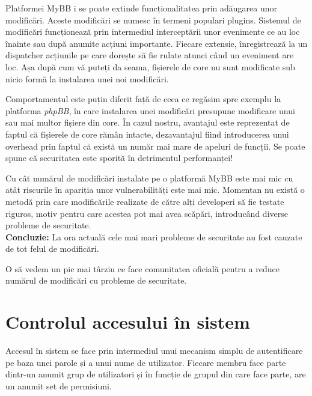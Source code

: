 Platformei MyBB i se poate extinde funcționalitatea prin adăugarea unor modificări. Aceste modificări se numesc în termeni populari plugins. Sistemul de modificări funcționează prin intermediul interceptării unor evenimente ce au loc înainte sau după anumite acțiuni importante. Fiecare extensie, înregistrează la un dispatcher acțiunile pe care dorește să fie rulate atunci când un eveniment are loc. Așa după cum vă puteți da seama, fișierele de core nu sunt modificate sub nicio formă la instalarea unei noi modificări.

Comportamentul este puțin diferit față de ceea ce regăsim spre exemplu la platforma \textit{phpBB}, în care instalarea unei modificări presupune modificare unui sau mai multor fișiere din core. În cazul nostru, avantajul este reprezentat de faptul că fișierele de core rămân intacte, dezavantajul fiind introducerea unui overhead prin faptul că există un număr mai mare de apeluri de funcții. Se poate spune că securitatea este sporită în detrimentul performanței!

\begin{theo}
Cu cât numărul de modificări instalate pe o platformă MyBB este mai mic cu atât riscurile în apariția unor vulnerabilități este mai mic. Momentan nu există o metodă prin care modificările realizate de către alți developeri să fie testate riguros, motiv pentru care acestea pot mai avea scăpări, introducând diverse probleme de securitate.\\
\textbf{Concluzie:} La ora actuală cele mai mari probleme de securitate au fost cauzate de tot felul de modificări.
\end{theo}

O să vedem un pic mai târziu ce face comunitatea oficială pentru a reduce numărul de modificări cu probleme de securitate.

\section{Controlul accesului în sistem}

Accesul în sistem se face prin intermediul unui mecanism simplu de autentificare pe baza unei parole și a unui nume de utilizator. Fiecare membru face parte dintr-un anumit grup de utilizatori și în funcție de grupul din care face parte, are un anumit set de permisiuni.

